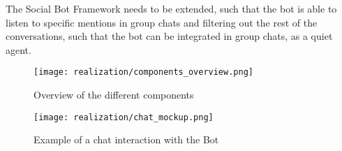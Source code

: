 The Social Bot Framework needs to be extended, such that the bot is able to listen to specific mentions in group chats and filtering out the rest of the conversations, such that the bot can be integrated in group chats, as a quiet agent.

\begin{figure}[h]
    \centering
    \texttt{[image: realization/components\_overview.png]}
    \caption{Overview of the different components}
    \label{fig:componentsOverview}
\end{figure}

\begin{figure}[h]
    \centering
    \texttt{[image: realization/chat\_mockup.png]}
    \caption{Example of a chat interaction with the Bot}
    \label{fig:chatMockup}
\end{figure}